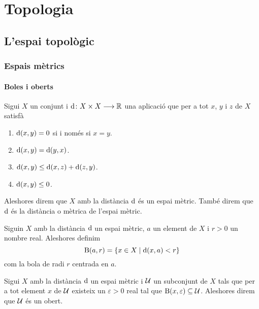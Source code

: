 \documentclass[../../Main.tex]{subfiles}
\begin{document}
\part{Topologia}
\chapter{L'espai topològic}
\section{Espais mètrics}
	\subsection{Boles i oberts}
	\begin{definition}
		\label{def:espai mètric}
		\label{def:distància}
		Sigui \(X\) un conjunt i \(\operatorname{d}\colon X\times X\longrightarrow\mathbb{R}\) una aplicació que per a tot \(x\), \(y\) i \(z\) de \(X\) satisfà
		\begin{enumerate}
			\item \(\operatorname{d}(x,y)=0\) si i només si \(x=y\).
			\item \(\operatorname{d}(x,y)=\operatorname{d}(y,x)\).
			\item \(\operatorname{d}(x,y)\leq\operatorname{d}(x,z)+\operatorname{d}(z,y)\).
			\item \(\operatorname{d}(x,y)\leq0\).
		\end{enumerate}
		Aleshores direm que \(X\) amb la distància \(\operatorname{d}\) és un espai mètric. També direm que \(\operatorname{d}\) és la distància o mètrica de l'espai mètric.
	\end{definition}
	\begin{definition}[Bola]
		\label{def:bola}
		Siguin \(X\) amb la distància \(\operatorname{d}\) un espai mètric, \(a\) un element de \(X\) i \(r>0\) un nombre real. Aleshores definim
		\[
		    \operatorname{B}(a,r)=\{x\in X\mid\operatorname{d}(x,a)<r\}
		\]
		com la bola de radi \(r\) centrada en \(a\).
	\end{definition}
	\begin{definition}[Obert]
		\label{def:obert espai mètric}
		Sigui \(X\) amb la distància \(\operatorname{d}\) un espai mètric i \(\mathcal{U}\) un subconjunt de \(X\) tals que per a tot element \(x\) de \(\mathcal{U}\) existeix un \(\varepsilon>0\) real tal que \(\operatorname{B}(x,\varepsilon)\subseteq\mathcal{U}\). Aleshores direm que \(\mathcal{U}\) és un obert.
	\end{definition}
\end{document}
